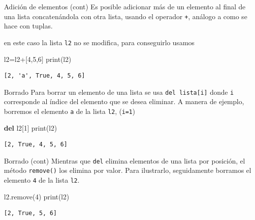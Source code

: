 \documentclass[
  ignorenonframetext,
  aspectratio=169,
  spanish,
]{beamer}
\newenvironment{Shaded}{\begin{snugshade}}{\end{snugshade}}
\newcommand{\BuiltInTok}[1]{\textcolor[rgb]{0.00,0.23,0.31}{#1}}
\newcommand{\DecValTok}[1]{\textcolor[rgb]{0.68,0.00,0.00}{#1}}
\newcommand{\KeywordTok}[1]{\textcolor[rgb]{0.00,0.23,0.31}{\textbf{#1}}}
\newcommand{\NormalTok}[1]{\textcolor[rgb]{0.00,0.23,0.31}{#1}}
\newcommand{\OperatorTok}[1]{\textcolor[rgb]{0.37,0.37,0.37}{#1}}
\begin{document}
\begin{frame}[fragile]{Adición de elementos (cont)}
\label{adiciuxf3n-de-elementos-cont}
Es posible adicionar más de un elemento al final de una lista
concatenándola con otra lista, usando el operador \texttt{+}, análogo a
como se hace con tuplas.

en este caso la lista \texttt{l2} no se modifica, para conseguirlo
usamos

\begin{Shaded}
\begin{Highlighting}[]
\NormalTok{l2}\OperatorTok{=}\NormalTok{l2}\OperatorTok{+}\NormalTok{[}\DecValTok{4}\NormalTok{,}\DecValTok{5}\NormalTok{,}\DecValTok{6}\NormalTok{]  }
\BuiltInTok{print}\NormalTok{(l2)}
\end{Highlighting}
\end{Shaded}

\begin{verbatim}
[2, 'a', True, 4, 5, 6]
\end{verbatim}
\end{frame}

\begin{frame}[fragile]{Borrado}
\label{borrado}
Para borrar un elemento de una lista se usa \texttt{del\ lista{[}i{]}}
 donde \texttt{i} corresponde al índice del
elemento que se desea eliminar. A manera de ejemplo, borremos el
elemento \texttt{\textquotesingle{}a\textquotesingle{}} de la lista
\texttt{l2}, (\texttt{i=1})

\begin{Shaded}
\begin{Highlighting}[]
\KeywordTok{del}\NormalTok{ l2[}\DecValTok{1}\NormalTok{]  }
\BuiltInTok{print}\NormalTok{(l2)}
\end{Highlighting}
\end{Shaded}

\begin{verbatim}
[2, True, 4, 5, 6]
\end{verbatim}
\end{frame}

\begin{frame}[fragile]{Borrado (cont)}
\label{borrado-cont}
Mientras que \texttt{del} elimina elementos de una lista por posición,
el método \texttt{remove()}  los elimina
por valor. Para ilustrarlo, seguidamente borramos el elemento \texttt{4}
de la lista \texttt{l2}.

\begin{Shaded}
\begin{Highlighting}[]
\NormalTok{l2.remove(}\DecValTok{4}\NormalTok{)  }
\BuiltInTok{print}\NormalTok{(l2)}
\end{Highlighting}
\end{Shaded}

\begin{verbatim}
[2, True, 5, 6]
\end{verbatim}
\end{frame}
\end{document}
